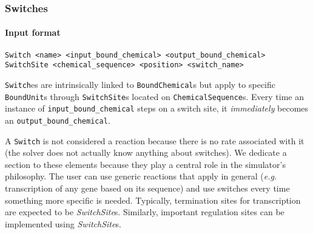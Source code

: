 
\subsubsection{Switches}

\paragraph{Input format}
\begin{verbatim}
Switch <name> <input_bound_chemical> <output_bound_chemical>
SwitchSite <chemical_sequence> <position> <switch_name>
\end{verbatim}

\texttt{Switch}es are intrinsically linked to \texttt{BoundChemical}s but apply to specific \texttt{BoundUnit}s through \texttt{SwitchSite}s located on \texttt{ChemicalSequence}s. Every time an instance of \texttt{input\_bound\_chemical} steps on a switch site, it \emph{immediately} becomes an \texttt{output\_bound\_chemical}.

A \texttt{Switch} is not considered a reaction because there is no rate associated with it (the solver does not actually know anything about switches). We dedicate a section to these elements because they play a central role in the simulator's philosophy. The user can use generic reactions that apply in general (\textit{e.g.} transcription of any gene based on its sequence) and use switches every time something more specific is needed. Typically, termination sites for transcription are expected to be \textit{SwitchSite}s. Similarly, important regulation sites can be implemented using \textit{SwitchSite}s.

